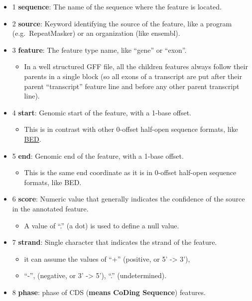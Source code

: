 \documentclass[]{article}
\providecommand{\tightlist}{%
  \setlength{\itemsep}{0pt}\setlength{\parskip}{0pt}}
\begin{document}
\begin{itemize}
\item
  1 \textbf{sequence}: The name of the sequence where the feature is
  located.
\item
  2 \textbf{source}: Keyword identifying the source of the feature, like
  a program (e.g.~RepeatMasker) or an organization (like ensembl).
\item
  3 \textbf{feature}: The feature type name, like ``gene'' or ``exon''.

  \begin{itemize}
  \tightlist
  \item
    In a well structured GFF file, all the children features always
    follow their parents in a single block (so all exons of a transcript
    are put after their parent ``transcript'' feature line and before
    any other parent transcript line).
  \end{itemize}
\item
  4 \textbf{start}: Genomic start of the feature, with a 1-base offset.

  \begin{itemize}
  \tightlist
  \item
    This is in contrast with other 0-offset half-open sequence formats,
    like \href{}{BED}.
  \end{itemize}
\item
  5 \textbf{end}: Genomic end of the feature, with a 1-base offset.

  \begin{itemize}
  \tightlist
  \item
    This is the same end coordinate as it is in 0-offset half-open
    sequence formats, like BED.
  \end{itemize}
\item
  6 \textbf{score}: Numeric value that generally indicates the
  confidence of the source in the annotated feature.

  \begin{itemize}
  \tightlist
  \item
    A value of ``.'' (a dot) is used to define a null value.
  \end{itemize}
\item
  7 \textbf{strand}: Single character that indicates the strand of the
  feature.

  \begin{itemize}
  \tightlist
  \item
    it can assume the values of ``+'' (positive, or 5' -\textgreater{}
    3'),
  \item
    ``-'', (negative, or 3' -\textgreater{} 5'), ``.'' (undetermined).
  \end{itemize}
\item
  8 \textbf{phase}: phase of CDS (\textbf{means CoDing Sequence})
  features.


\end{itemize}
\end{document}
